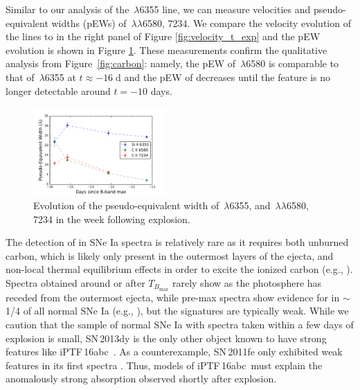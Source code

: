 \documentclass[twocolumn]{aastex61}
\newcommand{\abc}{iPTF\,16abc}
\begin{document}
Similar to our analysis of the \,$\lambda$6355 line, we 
can measure velocities and pseudo-equivalent widths (pEWs) of 
\,$\lambda\lambda$6580, 7234. We compare the velocity 
evolution of the  lines to  in the right panel 
of Figure \ref{fig:velocity_t_exp} and the pEW evolution is
shown in Figure \ref{fig:ew}. These measurements confirm the qualitative analysis from Figure~\ref{fig:carbon}: namely, the pEW of \,$\lambda$6580 is comparable to that
of \,$\lambda$6355 at $t \approx -16 \; \mathrm{d}$ and 
the pEW of  
decreases until the feature is no longer detectable 
around $t=-10$ days.

\begin{figure}[]
  \centering
  \includegraphics[width=0.45\textwidth]{pEW.pdf}
  \caption{Evolution of the pseudo-equivalent width of 
  \,$\lambda$6355, and \,$\lambda\lambda$6580, 
  7234 in the week following explosion.}
  \label{fig:ew}
\end{figure}

The detection of  in SNe Ia spectra is relatively rare
as it requires both unburned carbon, which is likely only present in the outermost layers of the ejecta, and non-local thermal equilibrium effects in order to excite the ionized carbon (e.g., \citealt{2007ApJ...654L..53T}). Spectra obtained around or after $T_{B_\mathrm{max}}$ rarely show  as the photosphere has receded from the outermost ejecta, while pre-max spectra show evidence for  in $\sim$1/4 of all normal SNe Ia (e.g., \citealt{2011ApJ...732...30P,2012MNRAS.425.1917S,2011ApJ...743...27T}), but the signatures are typically weak. While we caution that the sample of normal SNe Ia with spectra taken within a few days of explosion is small, SN\,2013dy is the only other object known to have strong  features like \abc\ \citet{2013ApJ...778L..15Z}. As a counterexample, SN\,2011fe only exhibited weak  features in its first spectra
\citep{2012ApJ...752L..26P}. Thus, models of \abc\ must explain the anomalously strong  absorption observed shortly after explosion.
\end{document}
